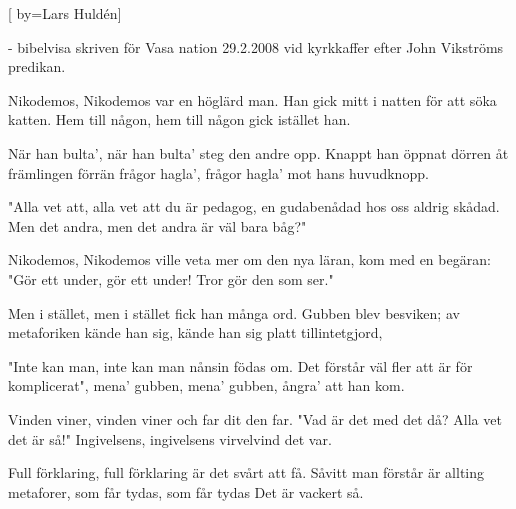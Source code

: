 

[
	by={Lars Huldén}] 

\beginverse*
- bibelvisa skriven för Vasa nation 29.2.2008 vid kyrkkaffer efter John Vikströms predikan.
\endverse

\beginverse*
Nikodemos, Nikodemos
var en höglärd man.
Han gick mitt i natten
för att söka katten.
Hem till någon, hem till någon
gick istället han.
\endverse

\beginverse*
När han bulta', när han bulta' 
steg den andre opp.
Knappt han öppnat dörren
åt främlingen förrän
frågor hagla', frågor hagla' 
mot hans huvudknopp.
\endverse

\beginverse*
"Alla vet att, alla vet att
du är pedagog,
en gudabenådad
hos oss aldrig skådad.
Men det andra, men det andra
är väl bara båg?"
\endverse

\beginverse*
Nikodemos, Nikodemos
ville veta mer
om den nya läran,
kom med en begäran:
"Gör ett under, gör ett under!
Tror gör den som ser."
\endverse

\beginverse*
Men i stället, men i stället
fick han många ord.
Gubben blev besviken;
av metaforiken
kände han sig, kände han sig
platt tillintetgjord,
\endverse

\beginverse*
"Inte kan man, inte kan man
nånsin födas om.
Det förstår väl fler att
är för komplicerat",
mena' gubben, mena' gubben,
ångra' att han kom.
\endverse

\beginverse*
Vinden viner, vinden viner
och far dit den far.
"Vad är det med det då?
Alla vet det är så!"
Ingivelsens, ingivelsens
virvelvind det var.
\endverse

\beginverse*
Full förklaring, full förklaring
är det svårt att få.
Såvitt man förstår är
allting metaforer,
som får tydas, som får tydas
Det är vackert så.
\endverse
\endsong
